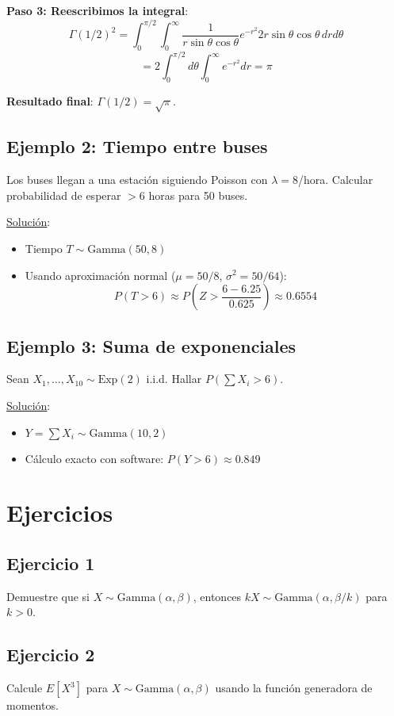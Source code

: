 \documentclass[letterpaper]{article}
\begin{document}
	\textbf{Paso 3: Reescribimos la integral}:
	\[ \Gamma(1/2)^2 = \int_0^{\pi/2} \int_0^\infty \frac{1}{r \sin \theta \cos \theta} e^{-r^2} 2r \sin \theta \cos \theta \, dr d\theta \]
	\[ = 2 \int_0^{\pi/2} d\theta \int_0^\infty e^{-r^2} dr = \pi \]
	
	\textbf{Resultado final}: $\Gamma(1/2) = \sqrt{\pi}$.
	
	\subsection{Ejemplo 2: Tiempo entre buses}
	Los buses llegan a una estación siguiendo Poisson con $\lambda=8$/hora. Calcular probabilidad de esperar $>6$ horas para 50 buses.
	
	\underline{Solución}:
	\begin{itemize}
		\item Tiempo $T \sim \text{Gamma}(50, 8)$
		\item Usando aproximación normal ($\mu=50/8$, $\sigma^2=50/64$):
		\[
		P(T>6) \approx P\left(Z > \frac{6-6.25}{0.625}\right) \approx 0.6554
		\]
	\end{itemize}
	
	\subsection{Ejemplo 3: Suma de exponenciales}
	Sean $X_1, \ldots, X_{10} \sim \text{Exp}(2)$ i.i.d. Hallar $P(\sum X_i > 6)$.
	
	\underline{Solución}:
	\begin{itemize}
		\item $Y = \sum X_i \sim \text{Gamma}(10, 2)$
		\item Cálculo exacto con software: $P(Y>6) \approx 0.849$
	\end{itemize}
	
	\section{Ejercicios}
	
	\subsection{Ejercicio 1}
	Demuestre que si $X \sim \text{Gamma}(\alpha, \beta)$, entonces $kX \sim \text{Gamma}(\alpha, \beta/k)$ para $k>0$.
	
	\subsection{Ejercicio 2}
	Calcule $E[X^3]$ para $X \sim \text{Gamma}(\alpha, \beta)$ usando la función generadora de momentos.
	
\end{document}

